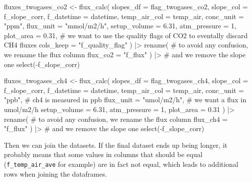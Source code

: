 \documentclass[
  letterpaper,
  DIV=11,
  numbers=noendperiod]{scrartcl}
\newenvironment{Shaded}{\begin{snugshade}}{\end{snugshade}}
\newcommand{\AttributeTok}[1]{\textcolor[rgb]{0.40,0.45,0.13}{#1}}
\newcommand{\CommentTok}[1]{\textcolor[rgb]{0.37,0.37,0.37}{#1}}
\newcommand{\DecValTok}[1]{\textcolor[rgb]{0.68,0.00,0.00}{#1}}
\newcommand{\FloatTok}[1]{\textcolor[rgb]{0.68,0.00,0.00}{#1}}
\newcommand{\FunctionTok}[1]{\textcolor[rgb]{0.28,0.35,0.67}{#1}}
\newcommand{\NormalTok}[1]{\textcolor[rgb]{0.00,0.23,0.31}{#1}}
\newcommand{\OtherTok}[1]{\textcolor[rgb]{0.00,0.23,0.31}{#1}}
\newcommand{\SpecialCharTok}[1]{\textcolor[rgb]{0.37,0.37,0.37}{#1}}
\newcommand{\StringTok}[1]{\textcolor[rgb]{0.13,0.47,0.30}{#1}}
\begin{document}
\begin{Shaded}
\begin{Highlighting}[]
\NormalTok{fluxes\_twogases\_co2 }\OtherTok{\textless{}{-}} \FunctionTok{flux\_calc}\NormalTok{(}
  \AttributeTok{slopes\_df =}\NormalTok{ flag\_twogases\_co2,}
  \AttributeTok{slope\_col =}\NormalTok{ f\_slope\_corr,}
  \AttributeTok{f\_datetime =}\NormalTok{ datetime,}
  \AttributeTok{temp\_air\_col =}\NormalTok{ temp\_air,}
  \AttributeTok{conc\_unit =} \StringTok{"ppm"}\NormalTok{,}
  \AttributeTok{flux\_unit =} \StringTok{"mmol/m2/h"}\NormalTok{,}
  \AttributeTok{setup\_volume =} \FloatTok{6.31}\NormalTok{,}
  \AttributeTok{atm\_pressure =} \DecValTok{1}\NormalTok{,}
  \AttributeTok{plot\_area =} \FloatTok{0.31}\NormalTok{,}
  \CommentTok{\# we want to use the quality flags of CO2 to eventally discard CH4 fluxes}
  \AttributeTok{cols\_keep =} \StringTok{"f\_quality\_flag"}
\NormalTok{) }\SpecialCharTok{|\textgreater{}}
\FunctionTok{rename}\NormalTok{( }\CommentTok{\# to avoid any confusion, we rename the flux column}
  \AttributeTok{flux\_co2 =} \StringTok{"f\_flux"}
\NormalTok{) }\SpecialCharTok{|\textgreater{}} \CommentTok{\# and we remove the slope one}
\FunctionTok{select}\NormalTok{(}\SpecialCharTok{{-}}\NormalTok{f\_slope\_corr)}

\NormalTok{fluxes\_twogases\_ch4 }\OtherTok{\textless{}{-}} \FunctionTok{flux\_calc}\NormalTok{(}
  \AttributeTok{slopes\_df =}\NormalTok{ flag\_twogases\_ch4,}
  \AttributeTok{slope\_col =}\NormalTok{ f\_slope\_corr,}
  \AttributeTok{f\_datetime =}\NormalTok{ datetime,}
  \AttributeTok{temp\_air\_col =}\NormalTok{ temp\_air,}
  \AttributeTok{conc\_unit =} \StringTok{"ppb"}\NormalTok{, }\CommentTok{\# ch4 is measured in ppb}
  \AttributeTok{flux\_unit =} \StringTok{"umol/m2/h"}\NormalTok{, }\CommentTok{\# we want a flux in umol/m2/h}
  \AttributeTok{setup\_volume =} \FloatTok{6.31}\NormalTok{,}
  \AttributeTok{atm\_pressure =} \DecValTok{1}\NormalTok{,}
  \AttributeTok{plot\_area =} \FloatTok{0.31}
\NormalTok{) }\SpecialCharTok{|\textgreater{}}
\FunctionTok{rename}\NormalTok{( }\CommentTok{\# to avoid any confusion, we rename the flux column}
  \AttributeTok{flux\_ch4 =} \StringTok{"f\_flux"}
\NormalTok{) }\SpecialCharTok{|\textgreater{}} \CommentTok{\# and we remove the slope one}
\FunctionTok{select}\NormalTok{(}\SpecialCharTok{{-}}\NormalTok{f\_slope\_corr)}
\end{Highlighting}
\end{Shaded}

Then we can join the datasets. If the final dataset ends up being
longer, it probably means that some values in columns that should be
equal (\texttt{f\_temp\_air\_ave} for example) are in fact not equal,
which leads to additional rows when joining the dataframes.
\end{document}
